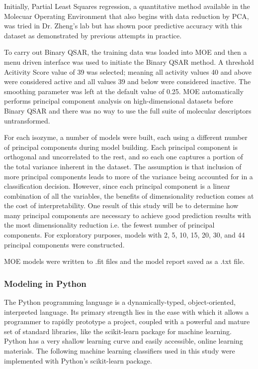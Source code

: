 Initially, Partial Least Squares regression, a quantitative method available in the Molecuar Operating Environment that also begins with data reduction by PCA, was tried in Dr. Zheng's lab but has shown poor predictive accuracy with this dataset as demonstrated by previous attempts in practice.

To carry out Binary QSAR, the training data was loaded into MOE and then a menu driven interface was used to initiate the Binary QSAR method. A threshold Acitivity Score value of 39 was selected; meaning all activity values 40 and above were considered active and all values 39 and below were considered inactive. The smoothing parameter was left at the default value of 0.25. MOE automatically performs principal component analysis on high-dimensional datasets before Binary QSAR and there was no way to use the full suite of molecular descriptors untransformed.

For each isozyme, a number of models were built, each using a different number of principal components during model building.  Each principal component is orthogonal and uncorrelated to the rest, and so each one captures a portion of the total variance inherent in the dataset. The assumption is that inclusion of more principal components leads to more of the variance being accounted for in a classification decision. However, since each principal component is a linear combination of all the variables, the benefits of dimensionality reduction comes at the cost of interpretability. One result of this study will be to determine how many principal components are necessary to achieve good prediction results with the most dimensionality reduction i.e. the fewest number of principal components.  For exploratory purposes, models with 2, 5, 10, 15, 20, 30, and 44 principal components were constructed. 

MOE models were written to .fit files and the model report saved as a .txt file.

\subsubsection{Modeling in Python}
The Python programming language is a dynamically-typed, object-oriented, interpreted language. Its primary strength lies in the ease with which it allows a programmer to rapidly prototype a project, coupled with a powerful and mature set of standard libraries, like the scikit-learn package for machine learning. Python has a very shallow learning curve and easily accessible, online learning materials. The following machine learning classifiers used in this study were implemented with Python's scikit-learn package.

